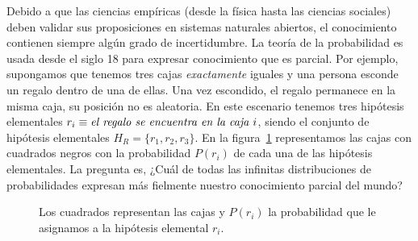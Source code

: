 \documentclass[a4paper,11pt]{book}
\theoremstyle{definition}
\begin{document}
Debido a que las ciencias emp\'iricas (desde la f\'isica hasta las ciencias sociales) deben validar sus proposiciones en sistemas naturales abiertos, el conocimiento contienen siempre alg\'un grado de incertidumbre.
%
La teor\'ia de la probabilidad es usada desde el siglo 18 para expresar conocimiento que es parcial.
%
Por ejemplo, supongamos que tenemos tres cajas \emph{exactamente} iguales y una persona esconde un regalo dentro de una de ellas.
%
Una vez escondido, el regalo permanece en la misma caja, su posición no es aleatoria.
%
En este escenario tenemos tres hipótesis elementales $r_i \equiv \emph{el regalo se encuentra en la caja }i$, siendo el conjunto de hipótesis elementales $H_R = \{r_1, r_2, r_3\}$.
%
En la figura~\ref{eq:campo_de_probabilidades_regalo} representamos las cajas con cuadrados negros con la probabilidad $P(r_i)$ de cada una de las hipótesis elementales.
%
La pregunta es, ¿Cuál de todas las infinitas distribuciones de probabilidades expresan más fielmente nuestro conocimiento parcial del mundo?
%
\begin{figure}[ht!]
\centering
\begin{subfigure}[b]{0.32\textwidth}
 \centering
\end{subfigure}
    \caption{Los cuadrados representan las cajas y $P(r_i)$ la probabilidad que le asignamos a la hipótesis elemental $r_i$.}
    \label{eq:campo_de_probabilidades_regalo}
\end{figure}

\end{document}
